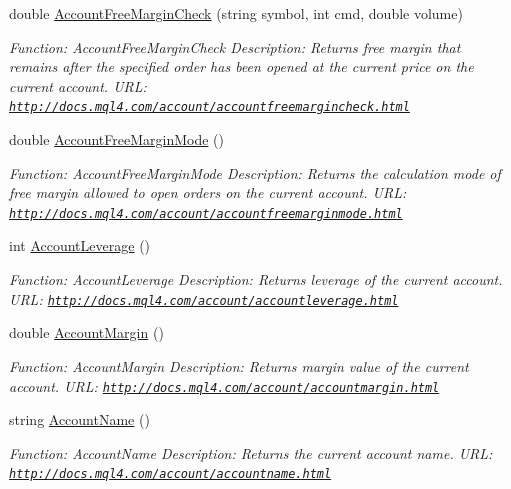 \begin{DoxyCompactItemize}
double \hyperlink{class_m_q_l4_c_sharp_1_1_base_1_1_m_q_l_base_a9715a33cec50d657e7858ef6753417b3}{Account\+Free\+Margin\+Check} (string symbol, int cmd, double volume)
\begin{DoxyCompactList}\small\item\em Function\+: Account\+Free\+Margin\+Check Description\+: Returns free margin that remains after the specified order has been opened at the current price on the current account. U\+RL\+: \href{http://docs.mql4.com/account/accountfreemargincheck.html}{\tt http\+://docs.\+mql4.\+com/account/accountfreemargincheck.\+html} \end{DoxyCompactList}\item 
double \hyperlink{class_m_q_l4_c_sharp_1_1_base_1_1_m_q_l_base_a5fd226c568c82db3a197ba790610f10a}{Account\+Free\+Margin\+Mode} ()
\begin{DoxyCompactList}\small\item\em Function\+: Account\+Free\+Margin\+Mode Description\+: Returns the calculation mode of free margin allowed to open orders on the current account. U\+RL\+: \href{http://docs.mql4.com/account/accountfreemarginmode.html}{\tt http\+://docs.\+mql4.\+com/account/accountfreemarginmode.\+html} \end{DoxyCompactList}\item 
int \hyperlink{class_m_q_l4_c_sharp_1_1_base_1_1_m_q_l_base_adbba60f52a9f3281bc19c7209bfa4ac6}{Account\+Leverage} ()
\begin{DoxyCompactList}\small\item\em Function\+: Account\+Leverage Description\+: Returns leverage of the current account. U\+RL\+: \href{http://docs.mql4.com/account/accountleverage.html}{\tt http\+://docs.\+mql4.\+com/account/accountleverage.\+html} \end{DoxyCompactList}\item 
double \hyperlink{class_m_q_l4_c_sharp_1_1_base_1_1_m_q_l_base_aca30037207f7187de3021fd6a7b9be2a}{Account\+Margin} ()
\begin{DoxyCompactList}\small\item\em Function\+: Account\+Margin Description\+: Returns margin value of the current account. U\+RL\+: \href{http://docs.mql4.com/account/accountmargin.html}{\tt http\+://docs.\+mql4.\+com/account/accountmargin.\+html} \end{DoxyCompactList}\item 
string \hyperlink{class_m_q_l4_c_sharp_1_1_base_1_1_m_q_l_base_a3d211f2507a20769796a283162d06f00}{Account\+Name} ()
\begin{DoxyCompactList}\small\item\em Function\+: Account\+Name Description\+: Returns the current account name. U\+RL\+: \href{http://docs.mql4.com/account/accountname.html}{\tt http\+://docs.\+mql4.\+com/account/accountname.\+html} \end{DoxyCompactList}\item 

\end{DoxyCompactItemize}
